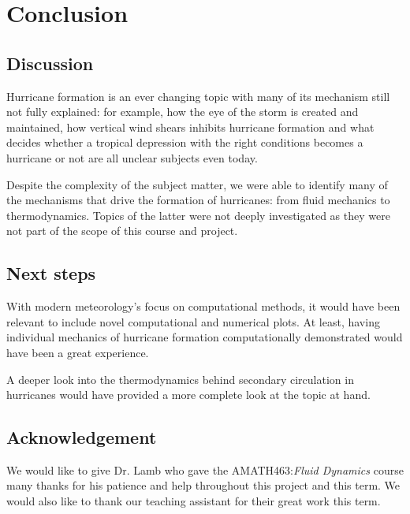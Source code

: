 \chapter{Conclusion}
\section{Discussion}
Hurricane formation is an ever changing topic with many of its mechanism still not fully explained: for example, how the eye of the storm is created and maintained, how vertical wind shears inhibits hurricane formation and what decides whether a tropical depression with the right conditions becomes a hurricane or not are all unclear subjects even today.

Despite the complexity of the subject matter, we were able to identify many of the mechanisms that drive the formation of hurricanes: from fluid mechanics to thermodynamics. Topics of the latter were not deeply investigated as they were not part of the scope of this course and project.

\section{Next steps}
With modern meteorology's focus on computational methods, it would have been relevant to include novel computational and numerical plots. At least, having individual mechanics of hurricane formation computationally demonstrated would have been a great experience.

A deeper look into the thermodynamics behind secondary circulation in hurricanes would have provided a more complete look at the topic at hand.

\section{Acknowledgement}
We would like to give Dr. Lamb who gave the AMATH463:\textit{Fluid Dynamics} course many thanks for his patience and help throughout this project and this term. We would also like to thank our teaching assistant for their great work this term.